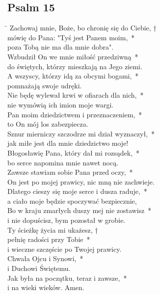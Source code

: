 \subsection*{Psalm 15}
\begin{tabbing}
\hspace{4mm} \= \>\kill
Zachowaj mnie, Boże, bo chronię się do Ciebie, †\\
mówię do Pana: "Tyś jest Panem moim,~*\\
poza Tobą nie ma dla mnie dobra".\\
\>Wzbudził On we mnie miłość przedziwną~*\\
\>do świętych, którzy mieszkają na Jego ziemi.\\
A wszyscy, którzy idą za obcymi bogami,~*\\
pomnażają swoje udręki.\\
\>Nie będę wylewał krwi w ofiarach dla nich,~*\\
\>nie wymówią ich imion moje wargi.\\
Pan moim dziedzictwem i przeznaczeniem,~*\\
to On mój los zabezpiecza.\\
\>Sznur mierniczy szczodrze mi dział wyznaczył,~*\\
\>jak miłe jest dla mnie dziedzictwo moje!\\
Błogosławię Pana, który dał mi rozsądek,~*\\
bo serce napomina mnie nawet nocą.\\
\>Zawsze stawiam sobie Pana przed oczy,~*\\
\>On jest po mojej prawicy, nic mną nie zachwieje.\\
Dlatego cieszy się moje serce i dusza raduje,~*\\
a ciało moje będzie spoczywać bezpiecznie,\\
\>Bo w kraju zmarłych duszy mej nie zostawisz~*\\
\>i nie dopuścisz, bym pozostał w grobie.\\
Ty ścieżkę życia mi ukażesz, †\\
pełnię radości przy Tobie~*\\
i wieczne szczęście po Twojej prawicy.\\
\>Chwała Ojcu i Synowi,~*\\
\>i Duchowi Świętemu.\\
Jak była na początku, teraz i zawsze,~*\\
i na wieki wieków. Amen.
\end{tabbing}